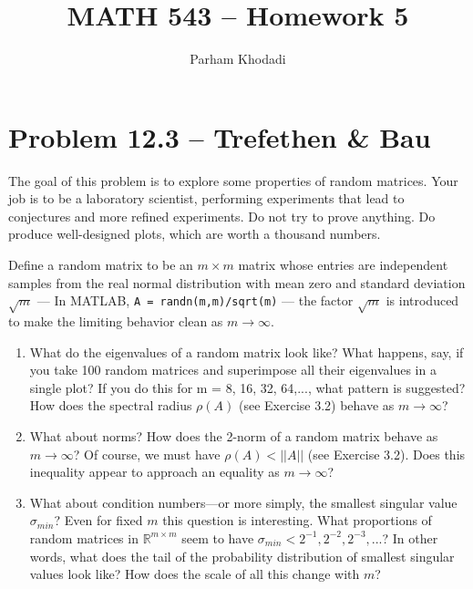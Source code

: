 \documentclass[11pt]{article}
\title{MATH 543 -- Homework 5}
\author{Parham Khodadi}
\date{}
\begin{document}
\maketitle

\section*{Problem 12.3 -- Trefethen \& Bau}

The goal of this problem is to explore some properties of random matrices. Your job is to be a laboratory scientist, performing experiments that lead to conjectures and more refined experiments. Do not try to prove anything. Do produce well-designed plots, which are worth a thousand numbers.

Define a random matrix to be an $m \times m$ matrix whose entries are independent samples from the real normal distribution with mean zero and standard deviation $\sqrt{m}$ --- In MATLAB, 
\newline \texttt{A = randn(m,m)/sqrt(m)} --- the factor $\sqrt{m}$ is introduced to make the limiting behavior clean as $m \rightarrow \infty$.

\begin{enumerate}[label=\Alph*.]
    \item What do the eigenvalues of a random matrix look like? What happens, say, if you take 100 random matrices and superimpose all their eigenvalues in a single plot? If you do this for m = 8, 16, 32, 64,..., what pattern is suggested? How does the spectral radius $\rho(A)$ (see Exercise 3.2) behave as $m \rightarrow \infty$?
    \item What about norms? How does the 2-norm of a random matrix behave as $m \rightarrow \infty$? Of course, we must have $\rho(A)<||A||$ (see Exercise 3.2). Does this inequality appear to approach an equality as $m \rightarrow \infty$?
    \item What about condition numbers—or more simply, the smallest singular value $\sigma_{min}$? Even for fixed $m$ this question is interesting. What proportions of random matrices in $\mathbb{R}^{m \times m}$ seem to have $\sigma_{min}<2^{-1},2^{-2},2^{-3},...$? In other words, what does the tail of the probability distribution of smallest singular values look like? How does the scale of all this change with $m$?
\end{enumerate}
\end{document}
